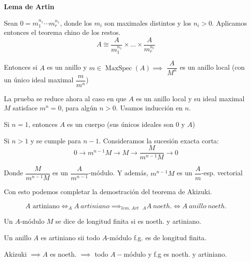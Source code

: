 \documentclass[openany]{book}
\begin{document}
\begin{lemma}
    \textbf{Lema de Artin}
\end{lemma}

\begin{demonstration}
    Sean $ 0 = m_1^{n_1} \cdots m_{r}^{n_{r}}$, donde los $ m_i$ son maximales distintos y los $ n_i > 0.$ Aplicamos entonces el teorema chino de los restos.
    $$ A \cong \dfrac{A}{m_1^{n_1}} \times ... \times \dfrac{A}{m_{r}^{n_{r}}} $$

    Entonces si $ A$ es un anillo y $ m \in \operatorname{MaxSpec}(A) \implies$ $ \dfrac{A}{M^{n}}$ es un anillo local (con un único ideal maximal $ \dfrac{m}{m^{n}}$)

    La prueba se reduce ahora al caso en que $ A$ es un anillo local y su ideal maximal $ M$ satisface $ m^{n} = 0$, para algún $ n>0$. Usamos inducción en $ n$.

    Si $ n = 1$, entonces $ A$ es un cuerpo (sus únicos ideales son $ 0$ y $ A$)

    Si $ n>1$ y se cumple para $ n-1$. Consideramos la sucesión exacta corta:
    $$ 0 \to m^{n-1} M \to M \to \dfrac{M}{m^{n-1}M} \to 0 $$

    Donde $ \dfrac{M}{m^{n-1}M}$ es un $ \dfrac{A}{m^{n-1}}$-módulo. Y además, $ m^{n-1}M$ es un $ \dfrac{A}{m}$-esp. vectorial
\end{demonstration}

Con esto podemos completar la demostración del teorema de Akizuki.

\begin{demonstration}
    $$ A \text{ artiniano} \iff _{A}A\ artiniano \implies_{lem.\ Art}\  _{A}A\  noeth. \iff A\ anillo\ noeth.  $$

\end{demonstration}


\begin{definition}
    Un $ A$-módulo $ M$ se dice de longitud finita si es noeth. y artiniano.
\end{definition}

\setcounter{propositiont}{30}

\begin{corollary}
    Un anillo $ A$ es artiniano sii todo $ A$-módulo f.g. es de longitud finita.
\end{corollary}

\begin{demonstration}
    Akizuki $ \implies A$ es noeth. $ \implies $ todo $ A-$módulo y f.g es noeth. y artiniano.
\end{demonstration}
\end{document}
